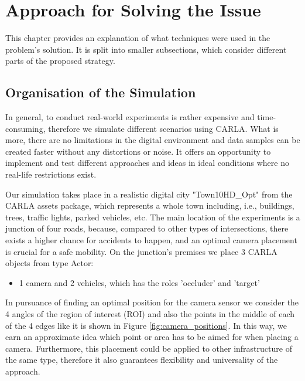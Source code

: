 \chapter{Approach for Solving the Issue} \label{approach}

This chapter provides an explanation of what techniques were used in the problem's solution. It is split into smaller subsections, which consider different parts of the proposed strategy.

\section{Organisation of the Simulation}
In general, to conduct real-world experiments is rather expensive and time-consuming, therefore we simulate different scenarios using CARLA. What is more, there are no limitations in the digital environment and data samples can be created faster without any distortions or noise. It offers an opportunity to implement and test different approaches and ideas in ideal conditions where no real-life restrictions exist.

Our simulation takes place in a realistic digital city "Town10HD\_Opt" from the CARLA assets package, which represents a whole town including, i.e., buildings, trees, traffic lights, parked vehicles, etc. The main location of the experiments is a junction of four roads, because, compared to other types of intersections, there exists a higher chance for accidents to happen, and an optimal camera placement is crucial for a safe mobility. On the junction's premises we place 3 CARLA objects from type Actor: 
\begin{itemize}
    \item 1 camera and 2 vehicles, which has the roles 'occluder' and 'target'
\end{itemize}
In pursuance of finding an optimal position for the camera sensor we consider the 4 angles of the region of interest (ROI) and also the points in the middle of each of the 4 edges like it is shown in Figure \ref{fig:camera_positions}. In this way, we earn an approximate idea which point or area has to be aimed for when placing a camera. Furthermore, this placement could be applied to other infrastructure of the same type, therefore it also guarantees flexibility and universality of the approach. 


